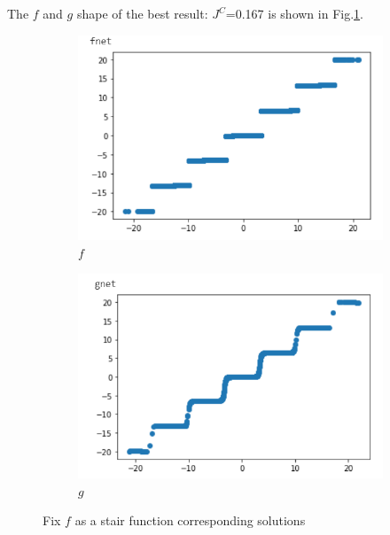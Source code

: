 \documentclass[conference,compsoc]{IEEEtran}
\begin{document}
    The $f$ and $g$ shape of the best result: $J^C$=0.167 is shown in Fig.\ref{fig:fixedFfunction}.

    \begin{figure}
      \centering
          \begin{subfigure}[b]{0.2\textwidth}            
                  \includegraphics[width=\textwidth]{images/fixedFfunction.png}
                  \caption{$f$}
          \end{subfigure}%
          \begin{subfigure}[b]{0.2\textwidth}
                  \centering
                  \includegraphics[width=\textwidth]{images/g_fixedFfunction.png}
                  \caption{$g$}
          \end{subfigure}
          \caption{Fix $f$ as a stair function corresponding solutions}
          \label{fig:fixedFfunction}
      \end{figure}
  
\end{document}
